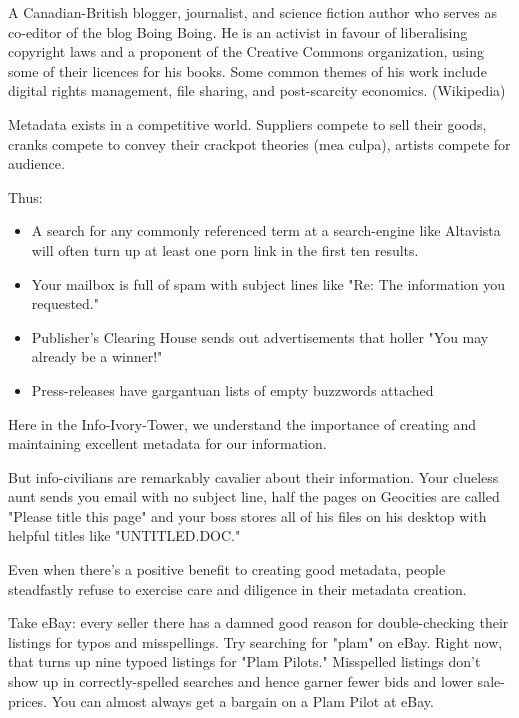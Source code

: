 \documentclass[a4paper,landscape,headrule,footrule,xetex]{foils}
\begin{document}
A Canadian-British blogger, journalist, and science fiction author who
serves as co-editor of the blog Boing Boing. He is an activist in
favour of liberalising copyright laws and a proponent of the Creative
Commons organization, using some of their licences for his books. Some
common themes of his work include digital rights management, file
sharing, and post-scarcity economics. (Wikipedia) 


Metadata exists in a competitive world. Suppliers compete to sell
their goods, cranks compete to convey their crackpot theories (mea
culpa), artists compete for audience.

Thus:
\begin{itemize}
\item    A search for any commonly referenced term at a search-engine like Altavista will often turn up at least one porn link in the first ten results.
\item     Your mailbox is full of spam with subject lines like "Re: The information you requested."
\item     Publisher's Clearing House sends out advertisements that holler "You may already be a winner!"
\item     Press-releases have gargantuan lists of empty buzzwords attached
\end{itemize}


Here in the Info-Ivory-Tower, we understand the importance of creating
and maintaining excellent metadata for our information.

But info-civilians are remarkably cavalier about their
information. Your clueless aunt sends you email with no subject line,
half the pages on Geocities are called "Please title this page" and
your boss stores all of his files on his desktop with helpful titles
like "UNTITLED.DOC."


Even when there's a positive benefit to creating good metadata, people
steadfastly refuse to exercise care and diligence in their metadata
creation.

Take eBay: every seller there has a damned good reason for
double-checking their listings for typos and misspellings. Try
searching for "plam" on eBay. Right now, that turns up nine typoed
listings for "Plam Pilots." Misspelled listings don't show up in
correctly-spelled searches and hence garner fewer bids and lower
sale-prices. You can almost always get a bargain on a Plam Pilot at
eBay.
\end{document}
